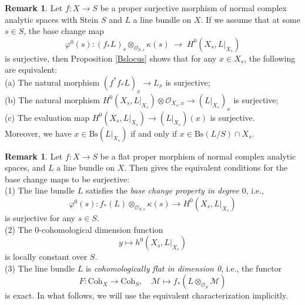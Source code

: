 \documentclass[12pt]{amsart}
\numberwithin{equation}{section}
\theoremstyle{definition}
\theoremstyle{plain}
\newtheorem*{thm A*}{Theorem A}
\newtheorem*{thm B*}{Theorem B}
\newtheorem*{thm C*}{Theorem C}
\newtheorem*{thm D*}{Theorem D}
\theoremstyle{definition}
\newtheorem{remark}  [theorem]     {Remark}
\renewcommand{\1}{\mathds{1}}
\renewcommand{\>}{\rightarrow}
\begin{document}
\begin{remark}\label{SteinBslocus}
Let $f: X \to S$ be a proper surjective morphism of normal complex analytic spaces with Stein $S$ and $L$ a line bundle on $X$. If we assume that at some $s \in S$, the base change map $$\varphi^0(s): (f_* L)_s \otimes_{\mathcal{O}_{S,s}} \kappa(s) \;\longrightarrow\; H^0(X_s, L|_{X_s})$$ is surjective, then
Proposition \ref{Bslocus} shows that for any $x\in X_s$, the following are equivalent:\\
(a) The natural morphism $(f^* f_* L)_x \to L_x$ is surjective;\\
(b) The natural morphism $H^0(X_s,L|_{X_s}) \otimes \mathcal{O}_{X_s ,x} \to (L|_{X_s})_x$ is surjective;\\
(c) The evaluation map $H^0(X_s, L|_{X_s}) \to (L|_{X_s})(x)$ is surjective. \\
Moreover, we have $x \in \mathrm{Bs}(L|_{X_s})$ if and only if $x \in \mathrm{Bs}(L/S)\cap X_s$.

\end{remark}
\begin{remark}\label{Grauertbasechange}
Let $f:X\to S$ be a flat proper morphism of normal complex analytic spaces, and $L$ a line bundle on $X$. Then \cite[Corollary~III.3.7]{BS} gives the equivalent conditions for the base change maps to be surjective: \\
(1) The line bundle $L$ satisfies the \emph{base change property in degree $0$}, i.e., $$ \varphi^0(s):  f_*(L) \otimes_{\mathcal{O}_{S,s}} \kappa(s) \rightarrow H^0\left(X_s, L|_{X_s}\right)$$is surjective for any $s\in S$.\\
(2) The $0$-cohomological dimension function $$y \mapsto h^0(X_s, L|_{X_s})$$ is locally constant over $S$.\\
(3) The line bundle $L$ is \emph{cohomologically flat in dimension 0}, i.e., the functor $$F: \text{Coh}_X \to \text{Coh}_S,\quad  \mathcal{M} \mapsto f_*(L \otimes_{\mathcal{O}_S}\mathcal{M})$$is exact. In what follows, we will use the equivalent characterization  implicitly.
\end{remark}
\end{document}
